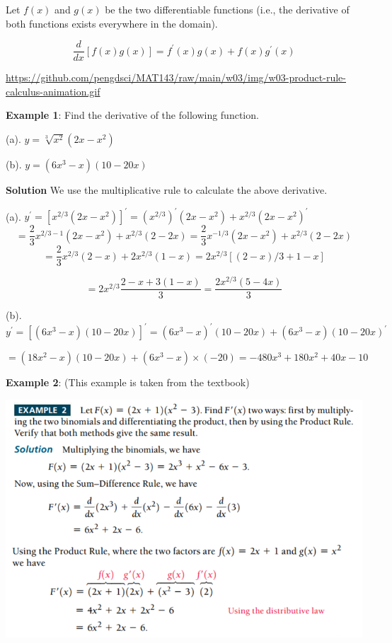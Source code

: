 \documentclass[
]{book}
\begin{document}
Let \(f(x)\) and \(g(x)\) be the two differentiable functions (i.e., the derivative of both functions exists everywhere in the domain).

\[
\frac{d}{dx}[f(x)g(x)] = f^\prime(x) g(x) + f(x) g^\prime(x)
\]

\hfill\break

\url{https://github.com/pengdsci/MAT143/raw/main/w03/img/w03-product-rule-calculus-animation.gif}

\hfill\break

\textbf{Example 1}: Find the derivative of the following function.

(a). \(y = \sqrt[3]{x^2}(2x - x^2)\)

(b). \(y = (6x^3 - x)(10 - 20x)\)

\textbf{Solution} We use the multiplicative rule to calculate the above derivative.

(a). \(y^\prime = [x^{2/3}(2x - x^2)]^\prime = (x^{2/3})^\prime(2x - x^2) + x^{2/3}(2x - x^2)^\prime\)
\[
= \frac{2}{3}x^{2/3-1}(2x-x^2) + x^{2/3}(2 - 2x) =\frac{2}{3}x^{-1/3}(2x-x^2)+x^{2/3}(2 - 2x)
\]
\[
=\frac{2}{3}x^{2/3}(2-x) + 2x^{2/3}(1 - x) = 2x^{2/3}[(2-x)/3+1 - x] 
\]

\[
= 2x^{2/3}\frac{2-x+3(1-x)}{3}=\frac{2x^{2/3}(5-4x)}{3}
\]

(b). \(y^\prime = [(6x^3 - x)(10 - 20x)]^\prime = (6x^3 - x)^\prime(10 - 20x) + (6x^3 - x)(10 - 20x)^\prime\)

\(= (18x^2 - x)(10 - 20x) + (6x^3 - x)\times (-20) = -480x^3+180x^2+40x-10\)

\hfill\break

\textbf{Example 2}: (This example is taken from the textbook)

\begin{center}\includegraphics[width=0.8\linewidth]{img03/w03-multiplicativeExample} \end{center}
\end{document}
